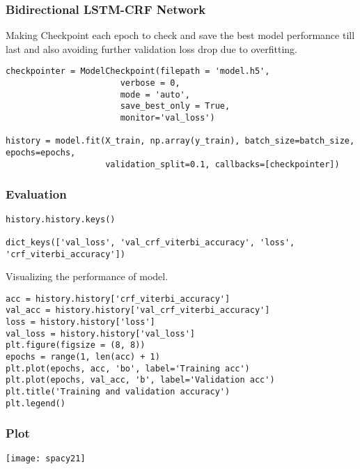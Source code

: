 \begin{frame}[fragile]\frametitle{Bidirectional LSTM-CRF Network}
Making Checkpoint each epoch to check and save the best model performance till last and also avoiding further validation loss drop due to overfitting.

\begin{lstlisting}
checkpointer = ModelCheckpoint(filepath = 'model.h5',
                       verbose = 0,
                       mode = 'auto',
                       save_best_only = True,
                       monitor='val_loss')
											 
history = model.fit(X_train, np.array(y_train), batch_size=batch_size, epochs=epochs,
                    validation_split=0.1, callbacks=[checkpointer])											 
\end{lstlisting}
\end{frame}

\begin{frame}[fragile]\frametitle{Evaluation}

\begin{lstlisting}
history.history.keys()

dict_keys(['val_loss', 'val_crf_viterbi_accuracy', 'loss', 'crf_viterbi_accuracy'])
\end{lstlisting}

Visualizing the performance of model.
\begin{lstlisting}
acc = history.history['crf_viterbi_accuracy']
val_acc = history.history['val_crf_viterbi_accuracy']
loss = history.history['loss']
val_loss = history.history['val_loss']
plt.figure(figsize = (8, 8))
epochs = range(1, len(acc) + 1)
plt.plot(epochs, acc, 'bo', label='Training acc')
plt.plot(epochs, val_acc, 'b', label='Validation acc')
plt.title('Training and validation accuracy')
plt.legend()
\end{lstlisting}


\end{frame}

\begin{frame}[fragile]\frametitle{Plot}
	
\begin{center}
\texttt{[image: spacy21]}
\end{center}


\end{frame}

